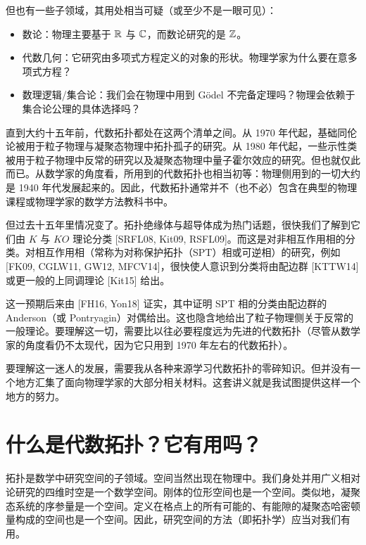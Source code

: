 但也有一些子领域，其用处相当可疑（或至少不是一眼可见）：

\begin{itemize}
  \item 数论：物理主要基于 $\mathbb{R}$ 与 $\mathbb{C}$，而数论研究的是 $\mathbb{Z}$。
  \item 代数几何：它研究由多项式方程定义的对象的形状。物理学家为什么要在意多项式方程？
  \item 数理逻辑/集合论：我们会在物理中用到 Gödel 不完备定理吗？物理会依赖于集合论公理的具体选择吗？
\end{itemize}

直到大约十五年前，代数拓扑都处在这两个清单之间。从 1970 年代起，基础同伦论被用于粒子物理与凝聚态物理中拓扑孤子的研究。从 1980 年代起，一些示性类被用于粒子物理中反常的研究以及凝聚态物理中量子霍尔效应的研究。但也就仅此而已。从数学家的角度看，所用到的代数拓扑也相当初等：物理侧用到的一切大约是 1940 年代发展起来的。因此，代数拓扑通常并不（也不必）包含在典型的物理课程或物理学家的数学方法教科书中。

但过去十五年里情况变了。拓扑绝缘体与超导体成为热门话题，很快我们了解到它们由 $K$ 与 $KO$ 理论分类 [SRFL08, Kit09, RSFL09]。而这是对非相互作用相的分类。对相互作用相（常称为对称保护拓扑（SPT）相或可逆相）的研究，例如 [FK09, CGLW11, GW12, MFCV14]，很快使人意识到分类将由配边群 [KTTW14] 或更一般的上同调理论 [Kit15] 给出。


这一预期后来由 [FH16, Yon18] 证实，其中证明 SPT 相的分类由配边群的 Anderson（或 Pontryagin）对偶给出。这也隐含地给出了粒子物理侧关于反常的一般理论。要理解这一切，需要比以往必要程度远为先进的代数拓扑（尽管从数学家的角度看仍不太现代，因为它只用到 1970 年左右的代数拓扑）。

要理解这一迷人的发展，需要我从各种来源学习代数拓扑的零碎知识。但并没有一个地方汇集了面向物理学家的大部分相关材料。这套讲义就是我试图提供这样一个地方的努力。

\section{什么是代数拓扑？它有用吗？}

拓扑是数学中研究空间的子领域。空间当然出现在物理中。我们身处并用广义相对论研究的四维时空是一个数学空间。刚体的位形空间也是一个空间。类似地，凝聚态系统的序参量是一个空间。定义在格点上的所有可能的、有能隙的凝聚态哈密顿量构成的空间也是一个空间。因此，研究空间的方法（即拓扑学）应当对我们有用。

